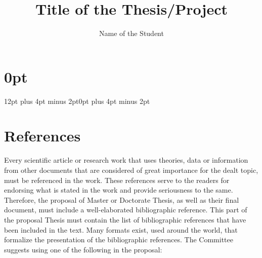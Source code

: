 \documentclass[11pt,twoside]{thesis_proposal-fiet_unicauca} %
\title{Title of the Thesis/Project}
\author{Name of the Student}
\begin{document}
\maketitle
\begin{romanpages}
\renewcommand{\contentsname}{\LARGE\centerline{Contents}}
\tableofcontents{}
\renewcommand{\listfigurename}{\LARGE\centerline{List of Figures}}
\listoffigures
\renewcommand{\listtablename}{\LARGE\centerline{List of Tables}}
\listoftables
\end{romanpages}
\setlength{\parskip}{1em}
\titlespacing\section{0pt}{12pt plus 4pt minus 2pt}{0pt plus 4pt minus 2pt}








\renewcommand\refname{\vskip -2cm}
\section{References}
\label{references}

Every scientific article or research work that uses theories, data or information from other documents that are considered of great importance for the dealt topic, must be referenced in the work. These references serve to the readers for endorsing what is stated in the work and provide seriousness to the same. Therefore, the proposal of Master or Doctorate Thesis, as well as their final document, must include a well-elaborated bibliographic reference. This part of the proposal Thesis must contain the list of bibliographic references that have been included in the text. Many formats exist, used around the world, that formalize the presentation of the bibliographic references. The Committee suggests using one of the following in the proposal:
\end{document}
